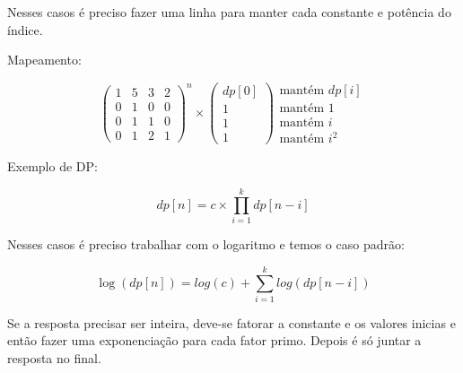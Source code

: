 \documentclass[11pt, a4paper, oneside]{book}
\begin{document}
Nesses casos é preciso fazer uma linha para manter cada constante e potência do índice.



Mapeamento:



$$ \begin{pmatrix} 1&5&3&2 \\ 0&1&0&0 \\ 0&1&1&0 \\ 0&1&2&1 \end{pmatrix}^n \times \begin{pmatrix} dp[0]   \\ 1       \\ 1       \\ 1\end {pmatrix} \begin{matrix} \text{mantém } dp[i]   \\ \text{mantém }1       \\ \text{mantém }i       \\ \text{mantém }i^2      \end {matrix} $$



\textbf{} 


Exemplo de DP:



$$ dp[n] =  c\times \prod_{i=1}^{k} dp[n-i] $$



Nesses casos é preciso trabalhar com o logaritmo e temos o caso padrão:





$$ \log(dp[n]) =  log(c) + \sum_{i=1}^{k} log(dp[n-i]) $$



Se a resposta precisar ser inteira, deve-se fatorar a constante e os valores inicias e então fazer uma exponenciação para cada fator primo. Depois é só juntar a resposta no final.

\hfill
\end{document}
